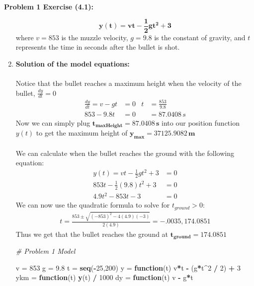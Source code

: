 \documentclass[11pt]{article}
\newenvironment{problem}[1]{\textbf{Problem #1: }}{\newpage}
\newenvironment{Shaded}{\begin{snugshade}}{\end{snugshade}}
\newcommand{\CommentTok}[1]{\textcolor[rgb]{0.56,0.35,0.01}{\textit{#1}}}
\newcommand{\ControlFlowTok}[1]{\textcolor[rgb]{0.13,0.29,0.53}{\textbf{#1}}}
\newcommand{\DecValTok}[1]{\textcolor[rgb]{0.00,0.00,0.81}{#1}}
\newcommand{\FloatTok}[1]{\textcolor[rgb]{0.00,0.00,0.81}{#1}}
\newcommand{\KeywordTok}[1]{\textcolor[rgb]{0.13,0.29,0.53}{\textbf{#1}}}
\newcommand{\NormalTok}[1]{#1}
\newcommand{\OperatorTok}[1]{\textcolor[rgb]{0.81,0.36,0.00}{\textbf{#1}}}
\newcommand{\StringTok}[1]{\textcolor[rgb]{0.31,0.60,0.02}{#1}}
\begin{document}
\begin{problem}{1 Exercise (4.1)}
\begin{enumerate}[label = \textbf{Step \arabic*.}]
			\[\boldsymbol{y(t) = vt - \frac{1}{2}gt^2 + 3}\]
			where $v = 853$ is the muzzle velocity, $g = 9.8$ is the constant of gravity, and $t$ represents the time in seconds after the bullet is shot. 
			\\
			\item \textbf{Solution of the model equations:}
			\\ \\
			Notice that the bullet reaches a maximum height when the velocity of the bullet, $\frac{dy}{dt} = 0$
			\begin{align*}
				\frac{dy}{dt} = v - gt &= 0 & t &= \frac{853}{9.8} \\
				853 - 9.8t &= 0 & &= 87.0408\,s
			\end{align*} 
			Now we can simply plug $\boldsymbol{t_{maxHeight} = 87.0408\,s}$ into our position function $y(t)$ to get the maximum height of $\boldsymbol{y_{max} = 37125.9082\,m}$
			\\ \\
			We can calculate when the bullet reaches the ground with the following equation:
			\begin{align*}
				y(t) = vt - \frac{1}{2}gt^2 + 3 &= 0 \\
				853t - \frac{1}{2}(9.8)t^2 + 3 &= 0 \\
				4.9t^2 - 853t - 3 &= 0
			\end{align*}
			We can now use the quadratic formula to solve for $t_{ground} > 0$:
			\begin{align*}
				t = \frac{853 \pm \sqrt{(-853)^2 - 4(4.9)(-3)}}{2(4.9)} = -.0035, 174.0851
			\end{align*}
			Thus we get that the bullet reaches the ground at $\boldsymbol{t_{ground} = 174.0851}$
			\newpage
\begin{Shaded}
\begin{Highlighting}[]
\CommentTok{# Problem 1 Model}

\NormalTok{v =}\StringTok{ }\DecValTok{853}
\NormalTok{g =}\StringTok{ }\FloatTok{9.8}
\NormalTok{t =}\StringTok{ }\KeywordTok{seq}\NormalTok{(}\OperatorTok{-}\DecValTok{25}\NormalTok{,}\DecValTok{200}\NormalTok{)}
\NormalTok{y =}\StringTok{ }\ControlFlowTok{function}\NormalTok{(t) v}\OperatorTok{*}\NormalTok{t }\OperatorTok{-}\StringTok{ }\NormalTok{(g}\OperatorTok{*}\NormalTok{t}\OperatorTok{^}\DecValTok{2} \OperatorTok{/}\StringTok{ }\DecValTok{2}\NormalTok{) }\OperatorTok{+}\StringTok{ }\DecValTok{3}
\NormalTok{ykm =}\StringTok{ }\ControlFlowTok{function}\NormalTok{(t) }\KeywordTok{y}\NormalTok{(t) }\OperatorTok{/}\StringTok{ }\DecValTok{1000}
\NormalTok{dy =}\StringTok{ }\ControlFlowTok{function}\NormalTok{(t) v }\OperatorTok{-}\StringTok{ }\NormalTok{g}\OperatorTok{*}\NormalTok{t}



\end{Highlighting}
\end{Shaded}
\end{enumerate}
\end{problem}
\end{document}
